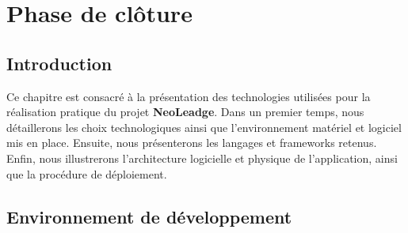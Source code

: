 %
%
%

\chapter{Phase de clôture}

\section*{Introduction}

Ce chapitre est consacré à la présentation des technologies utilisées pour la
réalisation pratique du projet \textbf{NeoLeadge}. Dans un premier temps, nous
détaillerons les choix technologiques ainsi que l'environnement matériel et
logiciel mis en place. Ensuite, nous présenterons les langages et frameworks
retenus. Enfin, nous illustrerons l'architecture logicielle et physique de
l'application, ainsi que la procédure de déploiement.

\section{Environnement de développement}

